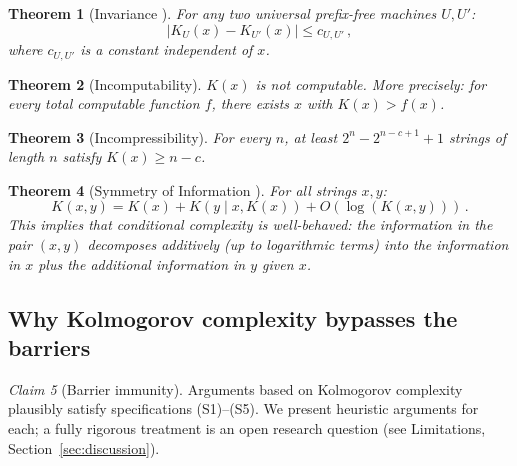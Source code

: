 \documentclass[aps,prd,twocolumn,superscriptaddress,nofootinbib]{revtex4-2}
\newtheorem{theorem}{Theorem}[section]
\theoremstyle{definition}
\theoremstyle{remark}
\newtheorem{claim}[theorem]{Claim}
\begin{document}
\begin{theorem}[Invariance {\cite{Kolmogorov1965,Solomonoff1964,Chaitin1966}}]
\label{thm:invariance}
For any two universal prefix-free machines $U, U'$:
\begin{equation}
|K_U(x) - K_{U'}(x)| \leq c_{U,U'}\,,
\end{equation}
where $c_{U,U'}$ is a constant independent of $x$.
\end{theorem}

\begin{theorem}[Incomputability]
\label{thm:incomputable}
$K(x)$ is not computable. More precisely: for every total computable function $f$, there exists $x$ with $K(x) > f(x)$.
\end{theorem}

\begin{theorem}[Incompressibility]
\label{thm:incompressible}
For every $n$, at least $2^n - 2^{n-c+1} + 1$ strings of length $n$ satisfy $K(x) \geq n - c$.
\end{theorem}

\begin{theorem}[Symmetry of Information {\cite{LiVitanyi2008}}]
\label{thm:symmetry}
For all strings $x, y$:
\begin{equation}
K(x, y) = K(x) + K(y \mid x, K(x)) + O(\log(K(x, y)))\,.
\end{equation}
This implies that conditional complexity is well-behaved: the information in the pair $(x, y)$ decomposes additively (up to logarithmic terms) into the information in $x$ plus the additional information in $y$ given $x$.
\end{theorem}

\subsection{Why Kolmogorov complexity bypasses the barriers}

\begin{claim}[Barrier immunity]
\label{claim:barrier_immune}
Arguments based on Kolmogorov complexity plausibly satisfy specifications (S1)--(S5). We present heuristic arguments for each; a fully rigorous treatment is an open research question (see Limitations, Section~\ref{sec:discussion}).
\end{claim}
\end{document}
